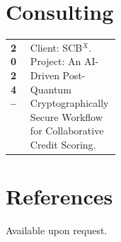 \documentclass[11pt]{article}
\makeatletter
\newcommand{\cventry}[2]{%
  \begin{tabularx}{\linewidth}{@{}p{0.18\linewidth} X@{}}
    \textbf{#1} & #2
  \end{tabularx}\par
}
\makeatother
\begin{document}


\section*{Consulting}
\cventry{2024--}{Client: SCB$^{X}$. Project: An AI-Driven Post-Quantum Cryptographically Secure Workflow for Collaborative Credit Scoring.}

\section*{References}
Available upon request.
\end{document}
